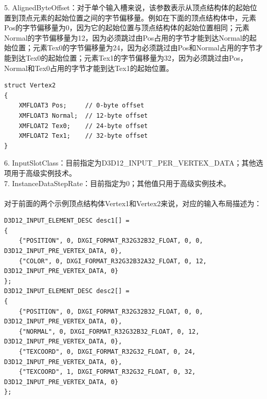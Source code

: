 \documentclass[11pt,a4paper,oldfontcommands]{memoir}
\begin{document}
{\begin{flushleft}
5. AlignedByteOffset：对于单个输入槽来说，该参数表示从顶点结构体的起始位置到顶点元素的起始位置之间的字节偏移量。例如在下面的顶点结构体中，元素Pos的字节偏移量为0，因为它的起始位置与顶点结构体的起始位置相同；元素Normal的字节偏移量为12，因为必须跳过由Pos占用的字节才能到达Normal的起始位置；元素Tex0的字节偏移量为24，因为必须跳过由Pos和Normal占用的字节才能到达Tex0的起始位置；元素Tex1的字节偏移量为32，因为必须跳过由Pos，Normal和Tex0占用的字节才能到达Tex1的起始位置。\\
\begin{lstlisting}
struct Vertex2
{
    XMFLOAT3 Pos;     // 0-byte offset
    XMFLOAT3 Normal;  // 12-byte offset
    XMFLOAT2 Tex0;    // 24-byte offset
    XMFLOAT2 Tex1;    // 32-byte offset
}
\end{lstlisting}
6. InputSlotClass：目前指定为D3D12\_INPUT\_PER\_VERTEX\_DATA；其他选项用于高级实例技术。\\
7. InstanceDataStepRate：目前指定为0；其他值只用于高级实例技术。\\
~\\
对于前面的两个示例顶点结构体Vertex1和Vertex2来说，对应的输入布局描述为：
\begin{lstlisting}
D3D12_INPUT_ELEMENT_DESC desc1[] = 
{
    {"POSITION", 0, DXGI_FORMAT_R32G32B32_FLOAT, 0, 0, D3D12_INPUT_PRE_VERTEX_DATA, 0},
    {"COLOR", 0, DXGI_FORMAT_R32G32B32A32_FLOAT, 0, 12, D3D12_INPUT_PRE_VERTEX_DATA, 0}
};
D3D12_INPUT_ELEMENT_DESC desc2[] =
{
    {"POSITION", 0, DXGI_FORMAT_R32G32B32_FLOAT, 0, 0,  D3D12_INPUT_PRE_VERTEX_DATA, 0},
    {"NORMAL", 0, DXGI_FORMAT_R32G32B32_FLOAT, 0, 12, D3D12_INPUT_PRE_VERTEX_DATA, 0},
    {"TEXCOORD", 0, DXGI_FORMAT_R32G32_FLOAT, 0, 24, D3D12_INPUT_PRE_VERTEX_DATA, 0},
    {"TEXCOORD", 1, DXGI_FORMAT_R32G32_FLOAT, 0, 32, D3D12_INPUT_PRE_VERTEX_DATA, 0}
};
\end{lstlisting}
\end{flushleft}
}
\end{document}
